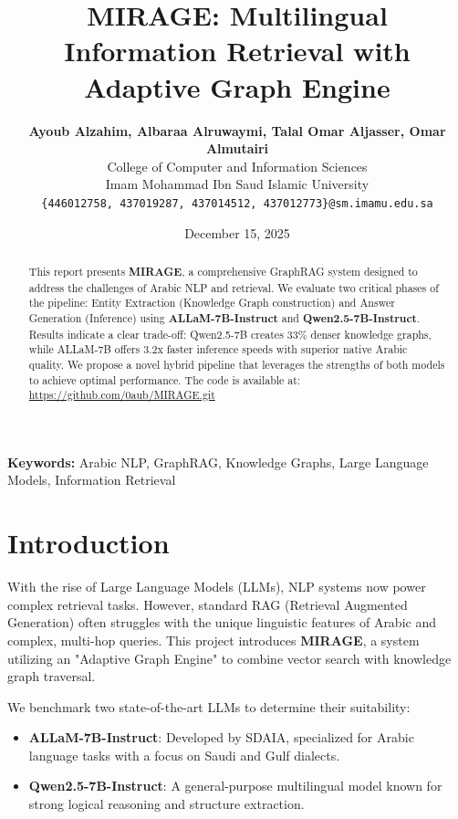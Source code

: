 \documentclass[11pt, onecolumn]{article}
\title{\textbf{\Huge MIRAGE: Multilingual Information Retrieval with Adaptive Graph Engine}}
\author{
    \textbf{Ayoub Alzahim, Albaraa Alruwaymi, Talal Omar Aljasser, Omar Almutairi} \\
    College of Computer and Information Sciences \\
    Imam Mohammad Ibn Saud Islamic University \\
    \texttt{\{446012758, 437019287, 437014512, 437012773\}@sm.imamu.edu.sa}
}
\date{December 15, 2025}
\begin{document}
\maketitle

\begin{abstract}
\noindent This report presents \textbf{MIRAGE}, a comprehensive GraphRAG system designed to address the challenges of Arabic NLP and retrieval. We evaluate two critical phases of the pipeline: Entity Extraction (Knowledge Graph construction) and Answer Generation (Inference) using \textbf{ALLaM-7B-Instruct} and \textbf{Qwen2.5-7B-Instruct}. Results indicate a clear trade-off: Qwen2.5-7B creates 33\% denser knowledge graphs, while ALLaM-7B offers 3.2x faster inference speeds with superior native Arabic quality. We propose a novel hybrid pipeline that leverages the strengths of both models to achieve optimal performance. The code is available at: \url{https://github.com/0aub/MIRAGE.git}
\end{abstract}

\vspace{1em}
\noindent \textbf{Keywords:} Arabic NLP, GraphRAG, Knowledge Graphs, Large Language Models, Information Retrieval
\vspace{1em}

\section{Introduction}
With the rise of Large Language Models (LLMs), NLP systems now power complex retrieval tasks. However, standard RAG (Retrieval Augmented Generation) often struggles with the unique linguistic features of Arabic and complex, multi-hop queries. This project introduces \textbf{MIRAGE}, a system utilizing an "Adaptive Graph Engine" to combine vector search with knowledge graph traversal.

We benchmark two state-of-the-art LLMs to determine their suitability:
\begin{itemize}[noitemsep]
    \item \textbf{ALLaM-7B-Instruct}: Developed by SDAIA, specialized for Arabic language tasks with a focus on Saudi and Gulf dialects.
    \item \textbf{Qwen2.5-7B-Instruct}: A general-purpose multilingual model known for strong logical reasoning and structure extraction.
\end{itemize}
\end{document}
